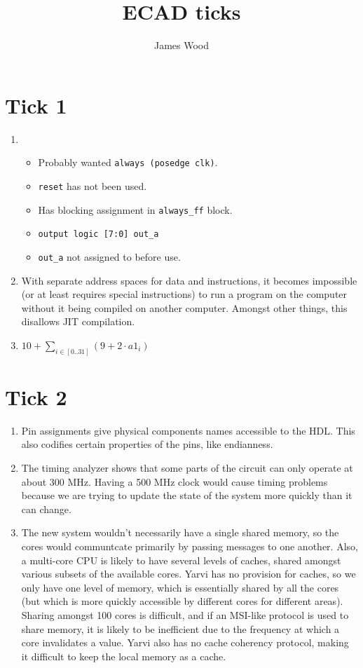 \documentclass{article}
\begin{document}
\title{ECAD ticks}
\author{James Wood}
\maketitle

\section*{Tick 1}
\begin{enumerate}
  \item
    \begin{itemize}
      \item Probably wanted \texttt{always \@(posedge clk)}.
      \item \texttt{reset} has not been used.
      \item Has blocking assignment in \texttt{always\_ff} block.
      \item \texttt{output logic [7:0] out\_a}
      \item \texttt{out\_a} not assigned to before use.
    \end{itemize}
  \item With separate address spaces for data and instructions, it becomes impossible (or at least requires special instructions) to run a program on the computer without it being compiled on another computer. Amongst other things, this disallows JIT compilation.
  \item $10 + \sum_{i \in [0..31]} \left(9 + 2 \cdot \mathit{a1}_i\right)$
\end{enumerate}

\section*{Tick 2}
\begin{enumerate}
  \item Pin assignments give physical components names accessible to the HDL. This also codifies certain properties of the pins, like endianness.
  \item The timing analyzer shows that some parts of the circuit can only operate at about 300 MHz. Having a 500 MHz clock would cause timing problems because we are trying to update the state of the system more quickly than it can change.
  \item The new system wouldn't necessarily have a single shared memory, so the cores would communtcate primarily by passing messages to one another. Also, a multi-core CPU is likely to have several levels of caches, shared amongst various subsets of the available cores. Yarvi has no provision for caches, so we only have one level of memory, which is essentially shared by all the cores (but which is more quickly accessible by different cores for different areas). Sharing amongst 100 cores is difficult, and if an MSI-like protocol is used to share memory, it is likely to be inefficient due to the frequency at which a core invalidates a value. Yarvi also has no cache coherency protocol, making it difficult to keep the local memory as a cache.
\end{enumerate}
\end{document}
